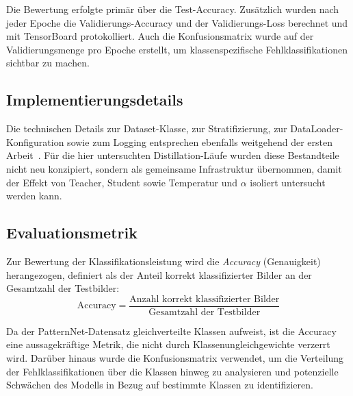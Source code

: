 Die Bewertung erfolgte primär über die Test-Accuracy.
Zusätzlich wurden nach jeder Epoche die Validierungs-Accuracy und der Validierungs-Loss berechnet und mit TensorBoard protokolliert.
Auch die Konfusionsmatrix wurde auf der Validierungsmenge pro Epoche erstellt, um klassenspezifische Fehlklassifikationen sichtbar zu machen.

\subsection{Implementierungsdetails}
\label{subsec:implementierung}

Die technischen Details zur Dataset-Klasse, zur Stratifizierung, zur DataLoader-Konfiguration sowie zum Logging entsprechen ebenfalls weitgehend der ersten Arbeit~\cite{steidlehenssler2026milestone1}.
Für die hier untersuchten Distillation-Läufe wurden diese Bestandteile nicht neu konzipiert, sondern als gemeinsame Infrastruktur übernommen, damit der Effekt von Teacher, Student sowie Temperatur und $\alpha$ isoliert untersucht werden kann.

\subsection{Evaluationsmetrik}
\label{subsec:evaluation}

Zur Bewertung der Klassifikationsleistung wird die \textit{Accuracy} (Genauigkeit) herangezogen, definiert als der Anteil korrekt klassifizierter Bilder an der Gesamtzahl der Testbilder:
\begin{equation}
  \text{Accuracy} = \frac{\text{Anzahl korrekt klassifizierter Bilder}}{\text{Gesamtzahl der Testbilder}}
\end{equation}

Da der PatternNet-Datensatz gleichverteilte Klassen aufweist, ist die Accuracy eine aussagekräftige Metrik, die nicht durch Klassenungleichgewichte verzerrt wird.
Darüber hinaus wurde die Konfusionsmatrix verwendet, um die Verteilung der Fehlklassifikationen über die Klassen hinweg zu analysieren und potenzielle Schwächen des Modells in Bezug auf bestimmte Klassen zu identifizieren.